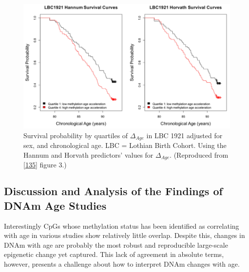 \documentclass[
]{book}
\begin{document}
\begin{figure}

{\centering \includegraphics[width=0.8\linewidth]{figs/Marioni2015f3} 

}

\caption{Survival probability by quartiles of \(\Delta_{Age}\) in LBC 1921 adjusted for sex, and chronological age. LBC = Lothian Birth Cohort. Using the Hannum and Horvath predictors' values for \(\Delta_{Age}\). (Reproduced from {[}\protect\hyperlink{ref-Marioni2015}{135}{]} figure 3.)}\label{fig:Marioni2015f3}
\end{figure}



\hypertarget{discussion-and-analysis-of-the-findings-of-dnam-age-studies}{%
\subsection{Discussion and Analysis of the Findings of DNAm Age Studies}\label{discussion-and-analysis-of-the-findings-of-dnam-age-studies}}

Interestingly CpGs whose methylation status has been identified as correlating with age in various studies show relatively little overlap. Despite this, changes in DNAm with age are probably the most robust and reproducible large-scale epigenetic change yet captured.
This lack of agreement in absolute terms, however, presents a challenge about how to interpret DNAm changes with age.
\end{document}
